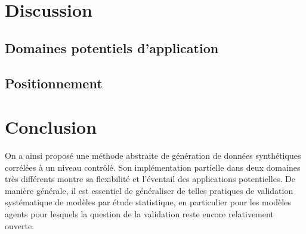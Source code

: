 \begin{table}

\end{table}





\section{Discussion}


\subsection{Domaines potentiels d'application}




\subsection{Positionnement}







\section{Conclusion}


On a ainsi proposé une méthode abstraite de génération de données synthétiques corrélées à un niveau contrôlé. Son implémentation partielle dans deux domaines très différents montre sa flexibilité et l'éventail des applications potentielles. De manière générale, il est essentiel de généraliser de telles pratiques de validation systématique de modèles par étude statistique, en particulier pour les modèles agents pour lesquels la question de la validation reste encore relativement ouverte.






\newpage


\footnotesize






